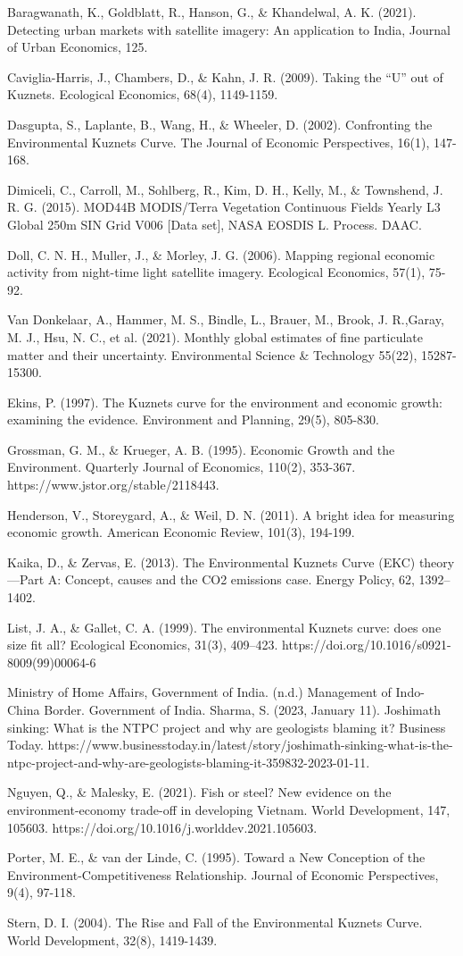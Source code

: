 \documentclass{article}
\begin{document}
Baragwanath, K., Goldblatt, R., Hanson, G., \& Khandelwal, A. K. (2021). Detecting urban markets with satellite imagery: An application to India, Journal of Urban Economics, 125.

Caviglia-Harris, J., Chambers, D., \& Kahn, J. R. (2009). Taking the “U” out of Kuznets. Ecological Economics, 68(4), 1149-1159.

Dasgupta, S., Laplante, B., Wang, H., \& Wheeler, D. (2002). Confronting the Environmental Kuznets Curve. The Journal of Economic Perspectives, 16(1), 147-168.

Dimiceli, C., Carroll, M., Sohlberg, R., Kim, D. H., Kelly, M., \& Townshend, J. R. G. (2015). MOD44B MODIS/Terra Vegetation Continuous Fields Yearly L3 Global 250m SIN Grid V006 [Data set], NASA EOSDIS L. Process. DAAC.

Doll, C. N. H., Muller, J., \& Morley, J. G. (2006). Mapping regional economic activity from night-time light satellite imagery. Ecological Economics, 57(1), 75-92.

Van Donkelaar, A., Hammer, M. S., Bindle, L., Brauer, M., Brook, J. R.,Garay, M. J., Hsu, N. C., et al. (2021). Monthly global estimates of fine particulate matter and their uncertainty. Environmental Science \& Technology 55(22), 15287-15300.

Ekins, P. (1997). The Kuznets curve for the environment and economic growth: examining the evidence. Environment and Planning, 29(5), 805-830.

Grossman, G. M., \& Krueger, A. B. (1995). Economic Growth and the Environment. Quarterly Journal of Economics, 110(2), 353-367. https://www.jstor.org/stable/2118443.

Henderson, V., Storeygard, A., \& Weil, D. N. (2011). A bright idea for measuring economic growth. American Economic Review, 101(3), 194-199.

Kaika, D., \& Zervas, E. (2013). The Environmental Kuznets Curve (EKC) theory—Part A: Concept, causes and the CO2 emissions case. Energy Policy, 62, 1392–1402.

List, J. A., \& Gallet, C. A. (1999). The environmental Kuznets curve: does one size fit all? Ecological Economics, 31(3), 409–423. https://doi.org/10.1016/s0921-8009(99)00064-6

Ministry of Home Affairs, Government of India. (n.d.) Management of Indo-China Border. Government of India.
Sharma, S. (2023, January 11). Joshimath sinking: What is the NTPC project and why 
are geologists blaming it? Business Today. https://www.businesstoday.in/latest/story/joshimath-sinking-what-is-the-ntpc-project-and-why-are-geologists-blaming-it-359832-2023-01-11.

Nguyen, Q., \& Malesky, E. (2021). Fish or steel? New evidence on the environment-economy trade-off in developing Vietnam. World Development, 147, 105603. https://doi.org/10.1016/j.worlddev.2021.105603.

Porter, M. E., \& van der Linde, C. (1995). Toward a New Conception of the Environment-Competitiveness Relationship. Journal of Economic Perspectives, 9(4), 97-118.

Stern, D. I. (2004). The Rise and Fall of the Environmental Kuznets Curve. World Development, 32(8), 1419-1439.
\end{document}
